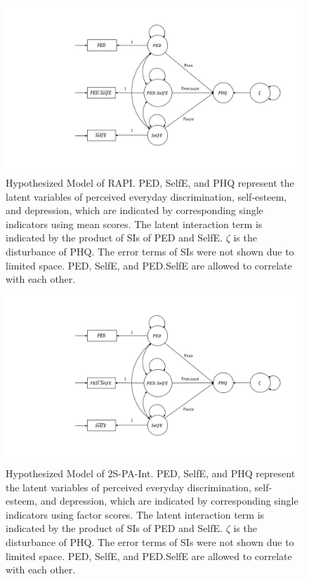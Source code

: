 \documentclass[
  man]{apa7}
\begin{document}
\begin{figure}

{\centering \includegraphics[width=1\linewidth]{Plots/Slide2} 

}

\caption{Hypothesized Model of RAPI. PED, SelfE, and PHQ represent the latent variables of perceived everyday discrimination, self-esteem, and depression, which are indicated by corresponding single indicators using mean scores. The latent interaction term is indicated by the product of SIs of PED and SelfE. $\zeta$ is the disturbance of PHQ. The error terms of SIs were not shown due to limited space. PED, SelfE, and PED.SelfE are allowed to correlate with each other.}\label{fig:figure-2}
\end{figure}

\begin{figure}

{\centering \includegraphics[width=1\linewidth]{Plots/Slide3} 

}

\caption{Hypothesized Model of 2S-PA-Int. PED, SelfE, and PHQ represent the latent variables of perceived everyday discrimination, self-esteem, and depression, which are indicated by corresponding single indicators using factor scores. The latent interaction term is indicated by the product of SIs of PED and SelfE. $\zeta$ is the disturbance of PHQ. The error terms of SIs were not shown due to limited space. PED, SelfE, and PED.SelfE are allowed to correlate with each other.}\label{fig:figure-3}
\end{figure}
\end{document}
